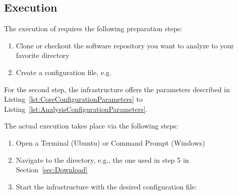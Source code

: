 \subsection{Execution}
\label{sec:Execution}
The execution of \thetool{} requires the following preparation steps:
\begin{enumerate}
	\item Clone or checkout the software repository you want to analyze to your favorite directory
	\item Create a \thetool{} configuration file, e.g. 
\end{enumerate}
For the second step, the infrastructure offers the parameters described in Listing~\ref{lst:CoreConfigurationParameters} to Listing~\ref{lst:AnalysisConfigurationParameters}.
\begin{figure}[ht]
	\centering
		
\end{figure}
\begin{figure}[ht]
	\centering
		
\end{figure}
\begin{figure}[ht]
	\centering
		
\end{figure}

The actual execution takes place via the following steps:
\begin{enumerate}
	\item Open a Terminal (Ubuntu) or Command Prompt (Windows)
	\item Navigate to the \thetool{} directory, e.g., the one used in step 5 in Section~\ref{sec:Download}
	\item Start the infrastructure with the desired configuration file: 
\end{enumerate}